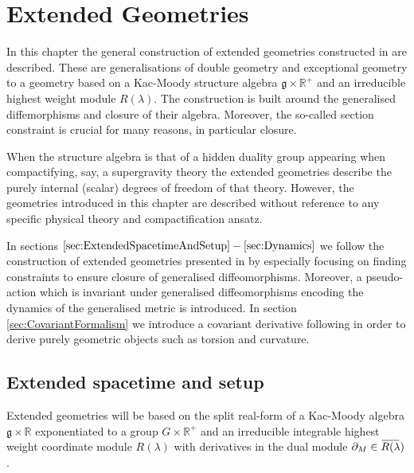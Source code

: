 \chapter{Extended Geometries}\label{chap:ExtendedGeometries}
In this chapter the general construction of extended geometries constructed in \cite{CederwallPalmkvist2017} are described. These are generalisations of double geometry and exceptional geometry to a geometry based on a Kac-Moody structure algebra $\mathfrak{g}\times\mathbb{R}^+$ and an irreducible highest weight module $R(\lambda)$. The construction is built around the generalised diffemorphisms and closure of their algebra. Moreover, the so-called section constraint is crucial for many reasons, in particular closure.

When the structure algebra is that of a hidden duality group appearing when compactifying, say, a supergravity theory the extended geometries describe the purely internal (scalar) degrees of freedom of that theory. However, the geometries introduced in this chapter are described without reference to any specific physical theory and compactification ansatz. 

In sections $\ref{sec:ExtendedSpacetimeAndSetup}-\ref{sec:Dynamics}$ we follow the construction of extended geometries presented in \cite{CederwallPalmkvist2017} by especially focusing on finding constraints to ensure closure of generalised diffeomorphisms. Moreover, a pseudo-action which is invariant under generalised diffeomorphisms encoding the dynamics of the generalised metric is introduced. In section \ref{sec:CovariantFormalism} we introduce a covariant derivative following \cite{Cederwall:2013naa} in order to derive purely geometric objects such as torsion and curvature. %

\section{Extended spacetime and setup\label{sec:ExtendedSpacetimeAndSetup}}
Extended geometries will be based on the split real-form of a Kac-Moody algebra $\mathfrak{g}\times\mathbb{R}$ exponentiated to a group $G\times\mathbb{R}^+$ and an irreducible integrable highest weight coordinate module $R(\lambda)$ with derivatives in the dual module $\pd_M\in \overbar{R(\lambda})$. 

